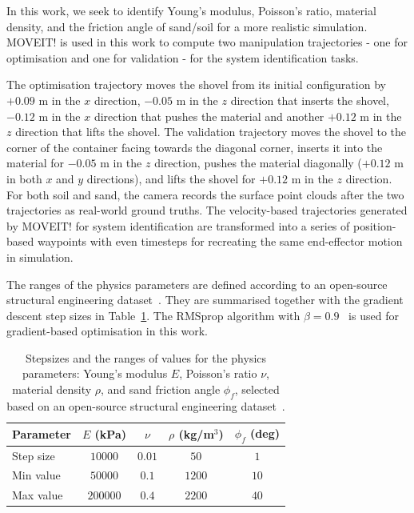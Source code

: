 \documentclass[letterpaper, 10 pt, journal, twoside]{ieeetran}
\begin{document}
In this work, we seek to identify Young's modulus, Poisson's ratio, material density, and the friction angle of sand/soil for a more realistic simulation. MOVEIT! is used in this work to compute two manipulation trajectories - one for optimisation and one for validation - for the system identification tasks. 

The optimisation trajectory moves the shovel from its initial configuration by $+0.09$ m in the $x$ direction, $-0.05$ m in the $z$ direction that inserts the shovel, $-0.12$ m in the $x$ direction that pushes the material and another $+0.12$ m in the $z$ direction that lifts the shovel. The validation trajectory moves the shovel to the corner of the container facing towards the diagonal corner, inserts it into the material for $-0.05$ m in the $z$ direction, pushes the material diagonally ($+0.12$ m in both $x$ and $y$ directions), and lifts the shovel for $+0.12$ m in the $z$ direction. For both soil and sand, the camera records the surface point clouds after the two trajectories as real-world ground truths. The velocity-based trajectories generated by MOVEIT! for system identification are transformed into a series of position-based waypoints with even timesteps for recreating the same end-effector motion in simulation.

The ranges of the physics parameters are defined according to an open-source structural engineering dataset~\cite{StructX}. They are summarised together with the gradient descent step sizes in Table~\ref{tab:lr}. The RMSprop algorithm with $\beta=0.9$~\cite{tieleman2012rmsprop} is used for gradient-based optimisation in this work.

\begin{table}[h]
\footnotesize
\centering
\begin{tabular}{l|cccc}
\toprule
Parameter     & $E$ (kPa) & $\nu$ & $\rho$ (kg/m$^3$) & $\phi_f$ (deg)\\
\midrule
Step size     & $10000$   & $0.01$ & $50$ & $1$ \\
Min value     & $50000$  & $0.1$ & $1200$ & $10$\\
Max value     & $200000$ & $0.4$  & $2200$ &$40$\\
\bottomrule
\end{tabular}
\caption{Stepsizes and the ranges of values for the physics parameters: Young's modulus $E$, Poisson's ratio $\nu$, material density $\rho$, and sand friction angle $\phi_f$, selected based on an open-source structural engineering dataset~\cite{StructX}.}
\label{tab:lr}
\end{table}
\end{document}
